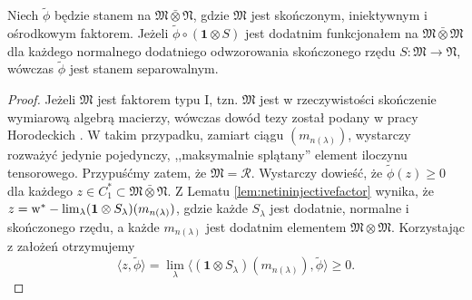 \begin{Lemma}
\label{lem:step2}
Niech $\tilde{\phi}$ będzie stanem na
$\mathfrak{M} \bar{\otimes} \mathfrak{N}$,
gdzie $\mathfrak{M}$ jest skończonym, iniektywnym i ośrodkowym faktorem.
Jeżeli $\tilde{\phi} \circ ( \mathbf{1} \otimes S)$ 
jest dodatnim funkcjonałem na
$\mathfrak{M} \bar{\otimes} \mathfrak{M}$
dla każdego normalnego dodatniego odwzorowania skończonego rzędu
$S: \mathfrak{M} \rightarrow \mathfrak{N}$,
wówczas $\tilde{\phi}$ jest stanem separowalnym.
\end{Lemma}
\begin{proof}
Jeżeli $\mathfrak{M}$ jest faktorem typu I, tzn. $\mathfrak{M}$ jest
w rzeczywistości skończenie wymiarową algebrą macierzy,
wówczas dowód tezy został podany w pracy Horodeckich
\cite{horodecki1996separability}.
W takim przypadku, zamiart ciągu $(m_{n(\lambda)})$,
wystarczy rozważyć jedynie pojedynczy,
,,maksymalnie splątany'' element iloczynu tensorowego.
Przypuśćmy zatem, że $\mathfrak{M} = \mathcal{R}$.
Wystarczy dowieść, że
$\tilde{\phi}(z) \geq 0$ dla każdego
$z \in C_{1}^{*} \subset \mathfrak{M} \bar{\otimes} \mathfrak{N}$.
Z Lematu \ref{lem:netininjectivefactor} wynika, że
$z = {\rm w}^*- \lim_{\lambda} (\mathbf{1} \otimes S_{\lambda})(m_{n(\lambda)})$,
gdzie każde $S_{\lambda}$
jest dodatnie, normalne i skończonego rzędu,
a każde $m_{n(\lambda)}$ jest dodatnim elementem $\mathfrak{M} \otimes \mathfrak{M}$.
Korzystając z założeń otrzymujemy
\begin{equation}
\langle z , \tilde{\phi} \rangle =\lim \limits_{\lambda}
\langle ( \mathbf{1} \otimes S_{\lambda}) (m_{n(\lambda)}), \tilde{\phi}
\rangle \geq 0.
\end{equation}
\end{proof}

